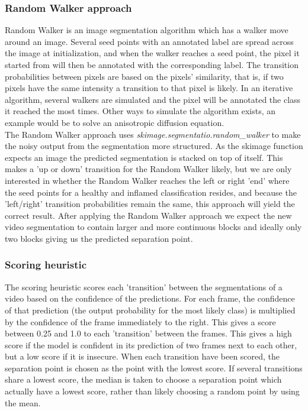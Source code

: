 \subsubsection{Random Walker approach}
Random Walker is an image segmentation algorithm which has a walker move around an image. Several seed points with an annotated label are spread across the image at initialization, and when the walker reaches a seed point, the pixel it started from will then be annotated with the corresponding label. The transition probabilities between pixels are based on the pixels' similarity, that is, if two pixels have the same intensity a transition to that pixel is likely. In an iterative algorithm, several walkers are simulated and the pixel will be annotated the class it reached the most times. Other ways to simulate the algorithm exists, an example would be to solve an anisotropic diffusion equation.\\
The Random Walker approach uses \textit{skimage.segmentatio.random\_walker} to make the noisy output from the segmentation more structured. As the skimage function expects an image the predicted segmentation is stacked on top of itself. This makes a 'up or down' transition for the Random Walker likely, but we are only interested in whether the Random Walker reaches the left or right 'end' where the seed points for a healthy and inflamed classification resides, and because the 'left/right' transition probabilities remain the same, this approach will yield the correct result. After applying the Random Walker approach we expect the new video segmentation to contain larger and more continuous blocks and ideally only two blocks giving us the predicted separation point. 

\subsubsection{Scoring heuristic}
The scoring heuristic scores each 'transition' between the segmentations of a video based on the confidence of the predictions. For each frame, the confidence of that prediction (the output probability for the most likely class) is multiplied by the confidence of the frame immediately to the right. This gives a score between 0.25 and 1.0 to each 'transition' between the frames. This gives a high score if the model is confident in its prediction of two frames next to each other, but a low score if it is insecure. When each transition have been scored, the separation point is chosen as the point with the lowest score. If several transitions share a lowest score, the median is taken to choose a separation point which actually have a lowest score, rather than likely choosing a random point by using the mean.

